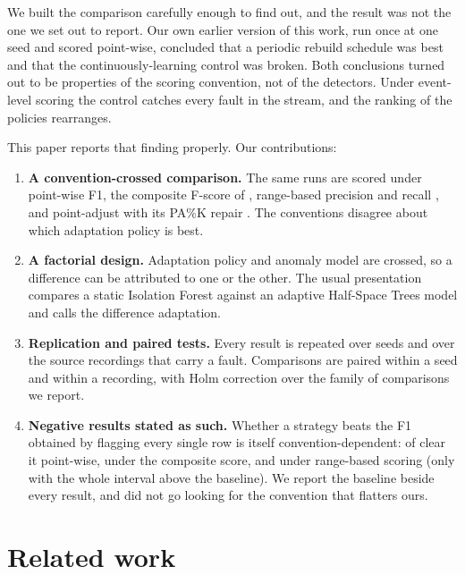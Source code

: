 \documentclass[11pt,a4paper]{article}
\begin{document}
We built the comparison carefully enough to find out, and the result was not
the one we set out to report. Our own earlier version of this work, run once at
one seed and scored point-wise, concluded that a periodic rebuild schedule was
best and that the continuously-learning control was broken. Both conclusions
turned out to be properties of the scoring convention, not of the
detectors. Under event-level scoring the control catches every fault in the
stream, and the ranking of the policies rearranges.

This paper reports that finding properly. Our contributions:

\begin{enumerate}
\item \textbf{A convention-crossed comparison.} The same runs are scored under
  point-wise F1, the composite F-score of \citet{garg2021evaluation},
  range-based precision and recall \citep{tatbul2018range}, and point-adjust
  \citep{xu2018donut} with its PA\%K repair \citep{kim2022rigorous}. The
  conventions disagree about which adaptation policy is best.
\item \textbf{A factorial design.} Adaptation policy and anomaly model are
  crossed, so a difference can be attributed to one or the other. The usual
  presentation compares a static Isolation Forest against an adaptive
  Half-Space Trees model and calls the difference adaptation.
\item \textbf{Replication and paired tests.} Every result is repeated over
  \NSeeds{} seeds and over the \NRecordings{} source recordings that carry a
  fault. Comparisons are paired within a seed and within a recording,
  with Holm correction over the family of comparisons we report.
\item \textbf{Negative results stated as such.} Whether a strategy beats the
  F1 obtained by flagging every single row is itself convention-dependent:
  \NBeatPoint{} of \NStrategies{} clear it point-wise, \NBeatComposite{}
  under the composite score, and \NBeatRange{} under range-based scoring (only
  \NBeatRangeClear{} with the whole interval above the baseline). We
  report the baseline beside every result, and did not go looking for the
  convention that flatters ours.
\end{enumerate}

\section{Related work}
\end{document}
